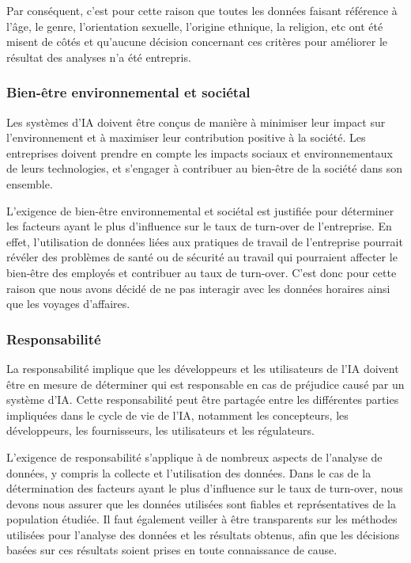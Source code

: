 Par conséquent, c'est pour cette raison que toutes les données faisant référence à l'âge, le genre, l'orientation sexuelle, l'origine ethnique, la religion, etc ont été misent de côtés et qu'aucune décision concernant ces critères pour améliorer le résultat des analyses n'a été entrepris.

\newpage        
\subsubsection{Bien-être environnemental et sociétal}
Les systèmes d'IA doivent être conçus de manière à minimiser leur impact sur l'environnement et à maximiser leur contribution positive à la société. Les entreprises doivent prendre en compte les impacts sociaux et environnementaux de leurs technologies, et s'engager à contribuer au bien-être de la société dans son ensemble. 

L'exigence de bien-être environnemental et sociétal est justifiée pour déterminer les facteurs ayant le plus d'influence sur le taux de turn-over de l'entreprise. En effet, l'utilisation de données liées aux pratiques de travail de l'entreprise pourrait révéler des problèmes de santé ou de sécurité au travail qui pourraient affecter le bien-être des employés et contribuer au taux de turn-over. C'est donc pour cette raison que nous avons décidé de ne pas interagir avec les données horaires ainsi que les voyages d'affaires. 

\subsubsection{Responsabilité}
La responsabilité implique que les développeurs et les utilisateurs de l'IA doivent être en mesure de déterminer qui est responsable en cas de préjudice causé par un système d'IA. Cette responsabilité peut être partagée entre les différentes parties impliquées dans le cycle de vie de l'IA, notamment les concepteurs, les développeurs, les fournisseurs, les utilisateurs et les régulateurs. 

L'exigence de responsabilité s'applique à de nombreux aspects de l'analyse de données, y compris la collecte et l'utilisation des données. Dans le cas de la détermination des facteurs ayant le plus d'influence sur le taux de turn-over, nous devons nous assurer que les données utilisées sont fiables et représentatives de la population étudiée. Il faut également veiller à être transparents sur les méthodes utilisées pour l'analyse des données et les résultats obtenus, afin que les décisions basées sur ces résultats soient prises en toute connaissance de cause.  

